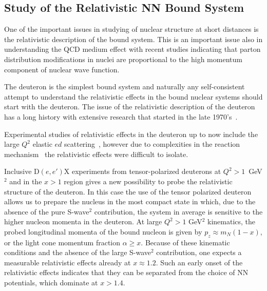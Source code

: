 \subsection{Study of the Relativistic NN Bound System}

One of the important issues in studying of nuclear structure  at short distances is the 
relativistic description of the bound system.  This is an important issue also in 
understanding the QCD medium effect with recent studies indicating that  parton distribution 
modifications  in nuclei are proportional to the high momentum component of nuclear wave function.

The deuteron is the simplest bound system and naturally any self-consistent attempt  to understand the 
relativistic effects in the bound nuclear systems  should start with the deuteron. 
The issue of the relativistic description of the deuteron has a long history with extensive research that started in the late 1970's~\cite{Gross:1982nz,Buck:1979ff,Frankfurt:1977vc,Frankfurt:1981mk}.

Experimental studies of relativistic effects in the deuteron  up to now include the large $Q^2$ elastic 
$ed$ scattering~\cite{Alexa:1998fe}, however  
due to complexities  in the reaction mechanism~\cite{VanOrden:1995eg} the relativistic effects were 
difficult to isolate.

Inclusive D$(e,e')$X experiments from tensor-polarized deuterons at  $Q^2>1$~GeV$^2$ and in the $x>1$ region gives 
a new possibility to probe the relativistic structure of the deuteron.  In this case the use of the tensor polarized
deuteron allows us to prepare the nucleus in the most compact state in which, due to the absence of the 
pure S-wave$^2$ contribution, the system in average is sensitive to the higher nucleon momenta in the deuteron.
At large $Q^2>1$ GeV$^2$ kinematics, the probed longitudinal momenta of the bound nucleon is given by $p_z \approx m_N(1-x)$, 
or the light cone momentum fraction $\alpha \ge x$. Because of these kinematic conditions and the absence of the 
large S-wave$^2$ contribution, one expects a measurable relativistic effects already at $x\approx 1.2$.  Such an early onset of the relativistic effects indicates that they can be separated from the choice of NN potentials, which dominate at $x>1.4$. 


